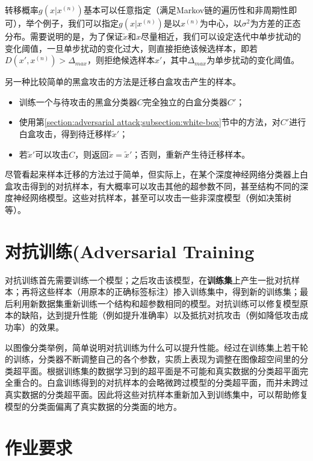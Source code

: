 \documentclass[journal, a4paper]{IEEEtran}
\begin{document}
转移概率$g(x|x^{(n)})$基本可以任意指定（满足Markov链的遍历性和非周期性即可），举个例子，我们可以指定$g(x|x^{(n)})$是以$x^{(n)}$为中心，以$\sigma^2$为方差的正态分布。需要说明的是，为了保证$\tilde x$和$x$尽量相近，我们可以设定迭代中单步扰动的变化阈值，一旦单步扰动的变化过大，则直接拒绝该候选样本，即若$D(x',x^{(n)})>\Delta_{max}$，则拒绝候选样本$x'$，其中$\Delta_{max}$为单步扰动的变化阈值。

另一种比较简单的黑盒攻击的方法是迁移白盒攻击产生的样本。

\begin{itemize}
    \item 训练一个与待攻击的黑盒分类器$C$完全独立的白盒分类器$C'$；
    \item 使用第\ref{section:adversarial attack;subsection:white-box}节中的方法，对$C'$进行白盒攻击，得到待迁移样$\tilde x'$；
    \item 若$\tilde x'$可以攻击$C$，则返回$\tilde x=\tilde x'$；否则，重新产生待迁移样本。
\end{itemize}

尽管看起来样本迁移的方法过于简单，但实际上，在某个深度神经网络分类器上白盒攻击得到的对抗样本，有大概率可以攻击其他的超参数不同，甚至结构不同的深度神经网络模型。这些对抗样本，甚至可以攻击一些非深度模型（例如决策树等）。

\section{对抗训练(Adversarial Training}
\label{section:adversarial training}

对抗训练首先需要训练一个模型；之后攻击该模型，在\textbf{训练集}上产生一批对抗样本；再将这些样本（用原本的正确标签标注）掺入训练集中，得到新的训练集；最后利用新数据集重新训练一个结构和超参数相同的模型。对抗训练可以修复模型原本的缺陷，达到提升性能（例如提升准确率）以及抵抗对抗攻击（例如降低攻击成功率）的效果。

以图像分类举例，简单说明对抗训练为什么可以提升性能。经过在训练集上若干轮的训练，分类器不断调整自己的各个参数，实质上表现为调整在图像超空间里的分类超平面。根据训练集的数据学习到的超平面是不可能和真实数据的分类超平面完全重合的。白盒训练得到的对抗样本的会略微跨过模型的分类超平面，而并未跨过真实数据的分类超平面。因此将这些对抗样本重新加入到训练集中，可以帮助修复模型的分类面偏离了真实数据的分类面的地方。

\section{作业要求}
\label{section:requirement}
\end{document}
